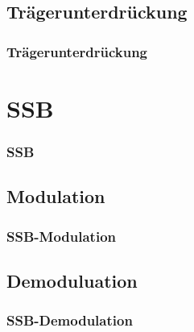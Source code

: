 \subsection{Trägerunterdrückung}

\begin{frame}
    \frametitle{Trägerunterdrückung}


\end{frame}

\section{SSB}

\begin{frame}
    \frametitle{SSB}


\end{frame}

\subsection{Modulation}

\begin{frame}
    \frametitle{SSB-Modulation}


\end{frame}

\subsection{Demoduluation}

\begin{frame}
    \frametitle{SSB-Demodulation}


\end{frame}

